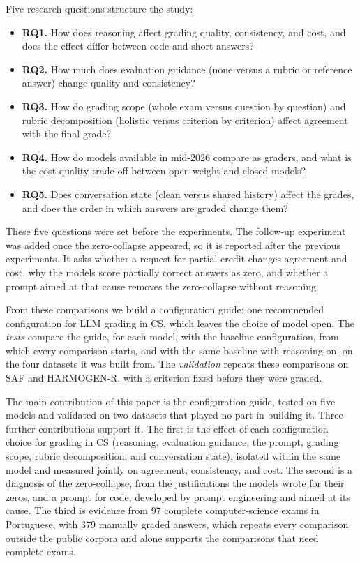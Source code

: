 Five research questions structure the study:
\begin{itemize}
  \item \textbf{RQ1.} How does reasoning affect grading quality, consistency, and cost, and does the
        effect differ between code and short answers?
  \item \textbf{RQ2.} How much does evaluation guidance (none versus a rubric or reference answer)
        change quality and consistency?
  \item \textbf{RQ3.} How do grading scope (whole exam versus question by question) and rubric
        decomposition (holistic versus criterion by criterion) affect agreement with the final
        grade?
  \item \textbf{RQ4.} How do models available in mid-2026 compare as graders, and what is the
        cost-quality trade-off between open-weight and closed models?
  \item \textbf{RQ5.} Does conversation state (clean versus shared history) affect the grades, and does the
        order in which answers are graded change them?
\end{itemize}
These five questions were set before the experiments. The follow-up experiment was added once the
zero-collapse appeared, so it is reported after the previous experiments. It asks whether a request for partial credit changes
agreement and cost, why the models score partially correct answers as zero, and whether a prompt aimed
at that cause removes the zero-collapse without reasoning.

From these comparisons we build a configuration guide: one recommended configuration for LLM grading in CS,
which leaves the choice of model open. The \emph{tests} compare
the guide, for each model, with the baseline configuration, from which every comparison starts, and with the same
baseline with reasoning on, on the four datasets it was built from. The \emph{validation} repeats these comparisons on SAF and HARMOGEN-R, with a
criterion fixed before they were graded.

The main contribution of this paper is the configuration guide, tested on five models and validated on two
datasets that played no part in building it. Three further contributions support it. The first is the effect of each configuration choice for grading in CS (reasoning,
evaluation guidance, the prompt, grading scope, rubric decomposition, and conversation state),
isolated within the same model and measured jointly on agreement, consistency, and cost. The second is a
diagnosis of the zero-collapse, from the justifications the models wrote for their zeros, and a prompt for code,
developed by prompt engineering and aimed at its cause. The third is evidence from 97 complete computer-science exams in Portuguese, with 379 manually graded answers, which repeats every
comparison outside the public corpora and alone supports the comparisons that need complete exams.

